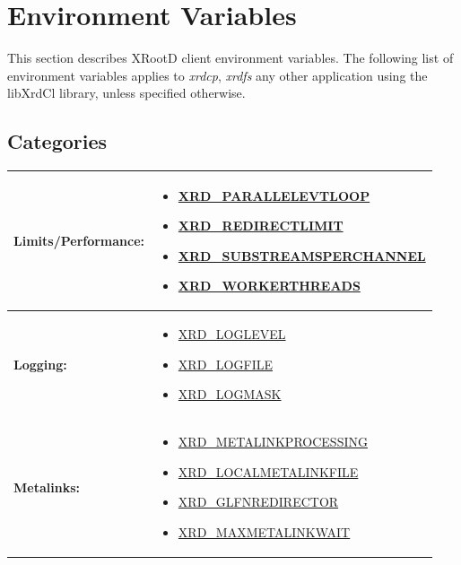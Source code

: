 \documentclass{article}
\begin{document}
\section{Environment Variables}

	This section describes XRootD client environment variables. The following list of environment 
	variables applies to \textit{xrdcp}, \textit{xrdfs} any other application using the libXrdCl 
	library, unless specified otherwise.
	
	\subsection{Categories}
		\begin{center}
		  \begin{longtable}{ | l | p{} | }
		    \hline
		    {\footnotesize \textbf{Limits/Performance:}} & \begin{scriptsize}
		    \begin{itemize}
		      \item \hyperref[env:parallelevtloop]{XRD_PARALLELEVTLOOP}
		      \item \hyperref[env:redirectlimit]{XRD_REDIRECTLIMIT}
		      \item \hyperref[env:substreamsperchannel]{XRD_SUBSTREAMSPERCHANNEL}
		      \item \hyperref[env:workerthreads]{XRD_WORKERTHREADS}
	   	    \end{itemize} 
		  	\end{scriptsize} \\
		    \hline
		    
		     {\footnotesize \textbf{Logging:}} & \begin{scriptsize} 
		     \begin{itemize}
	     	   \item \hyperref[env:loglevel]{XRD_LOGLEVEL}
	     	   \item \hyperref[env:logfile]{XRD_LOGFILE}
	     	   \item \hyperref[env:logmask]{XRD_LOGMASK}
		     \end{itemize} 
			 \end{scriptsize} \\ 
		     \hline
		     
		     {\footnotesize \textbf{Metalinks:}} & \begin{scriptsize}
		     \begin{itemize}
		       \item \hyperref[env:metalinkprocessing]{XRD_METALINKPROCESSING}
      	       \item \hyperref[env:localmetalinkfile]{XRD_LOCALMETALINKFILE}
		       \item \hyperref[env:glfnredirector]{XRD_GLFNREDIRECTOR}
		       \item \hyperref[env:maxmetalinkwait]{XRD_MAXMETALINKWAIT}
		     \end{itemize} 
		     \end{scriptsize} \\ 
		     \hline
		     

\end{longtable}
\end{center}
\end{document}
